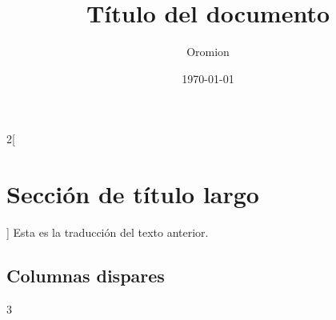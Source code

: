 \documentclass{article}
\title{Título del documento}
\author{Oromion}
\date{\today}
\begin{document}
	\maketitle

	\begin{abstract}
		\lipsum[2]
	\end{abstract}
	\begin{paracol}{2}[\section{Sección de título largo}]
		\lipsum[2]
		\switchcolumn
		Esta es la traducción del texto anterior.
		\switchcolumn*
		\lipsum[3]
		\switchcolumn
		\lipsum[2]
	\end{paracol}
	\subsection{Columnas dispares}
	\begin{paracol}{3}
		\lipsum[5]%
		\switchcolumn
		\lipsum[6]%
		\switchcolumn
		\lipsum[7]
	\end{paracol}



\end{document}
